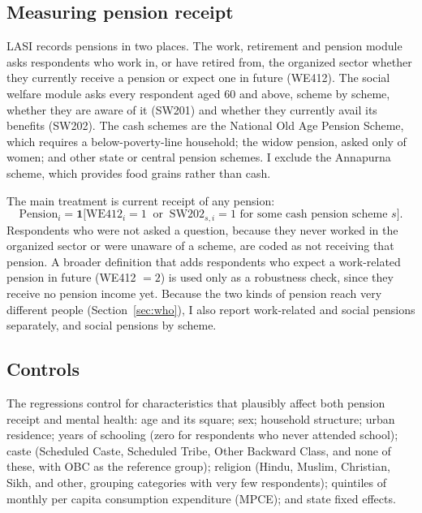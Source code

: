 \documentclass[11pt]{article}
\begin{document}
\subsection{Measuring pension receipt}

LASI records pensions in two places. The work, retirement and pension module
asks respondents who work in, or have retired from, the organized sector
whether they currently receive a pension or expect one in future (WE412). The
social welfare module asks every respondent aged 60 and above, scheme by
scheme, whether they are aware of it (SW201) and whether they currently avail
its benefits (SW202). The cash schemes are the National Old Age Pension
Scheme, which requires a below-poverty-line household; the widow pension,
asked only of women; and other state or central pension schemes. I exclude the
Annapurna scheme, which provides food grains rather than cash.

The main treatment is current receipt of any pension:
\begin{equation*}
  \text{Pension}_i = \mathbf{1}\big[\text{WE412}_i = 1 \ \text{ or } \ \text{SW202}_{s,i} = 1 \text{ for some cash pension scheme } s\big].
\end{equation*}
Respondents who were not asked a question, because they never worked in the
organized sector or were unaware of a scheme, are coded as not receiving that
pension. A broader definition that adds respondents who expect a work-related
pension in future (WE412 $= 2$) is used only as a robustness check, since they
receive no pension income yet. Because the two kinds of pension reach very
different people (Section~\ref{sec:who}), I also report work-related and
social pensions separately, and social pensions by scheme.

\subsection{Controls}

The regressions control for characteristics that plausibly affect both pension
receipt and mental health: age and its square; sex; household structure;
urban residence; years of schooling (zero for respondents who never attended
school); caste (Scheduled Caste, Scheduled Tribe, Other Backward Class, and
none of these, with OBC as the reference group); religion (Hindu, Muslim,
Christian, Sikh, and other, grouping categories with very few respondents);
quintiles of monthly per capita consumption expenditure (MPCE); and state
fixed effects.
\end{document}
